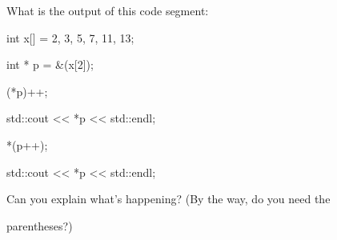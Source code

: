 What is the output of this code segment:



\begin{consolethree}[escapeinside=||]

int x[] = {2, 3, 5, 7, 11, 13};

int * p = &(x[2]);

(*p)++;

std::cout << *p << std::endl;

*(p++);

std::cout << *p << std::endl;

\end{consolethree}



Can you explain what's happening? (By the way, do you need the

parentheses?)

